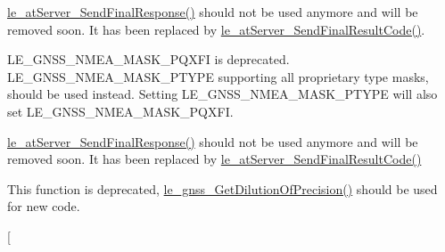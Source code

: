 
\begin{DoxyRefList}
\item[\label{deprecated__deprecated000008}%
\hypertarget{deprecated__deprecated000008}{}%
Page \hyperlink{c_atServer}{AT Commands Server} ]\hyperlink{le__at_server__interface_8h_a14c57753f986e5eb4928ea2eb350d9d9}{le\+\_\+at\+Server\+\_\+\+Send\+Final\+Response()} should not be used anymore and will be removed soon. It has been replaced by \hyperlink{le__at_server__interface_8h_ad3f175c366a50d92f8011d7062bdd147}{le\+\_\+at\+Server\+\_\+\+Send\+Final\+Result\+Code()}. 
\item[\label{deprecated__deprecated000003}%
\hypertarget{deprecated__deprecated000003}{}%
Page \hyperlink{platformConstraintsGnss}{G\+N\+SS platform constraints} ]L\+E\+\_\+\+G\+N\+S\+S\+\_\+\+N\+M\+E\+A\+\_\+\+M\+A\+S\+K\+\_\+\+P\+Q\+X\+FI is deprecated. L\+E\+\_\+\+G\+N\+S\+S\+\_\+\+N\+M\+E\+A\+\_\+\+M\+A\+S\+K\+\_\+\+P\+T\+Y\+PE supporting all proprietary type masks, should be used instead. Setting L\+E\+\_\+\+G\+N\+S\+S\+\_\+\+N\+M\+E\+A\+\_\+\+M\+A\+S\+K\+\_\+\+P\+T\+Y\+PE will also set L\+E\+\_\+\+G\+N\+S\+S\+\_\+\+N\+M\+E\+A\+\_\+\+M\+A\+S\+K\+\_\+\+P\+Q\+X\+FI. 
\item[\label{deprecated__deprecated000009}%
\hypertarget{deprecated__deprecated000009}{}%
Global \hyperlink{le__at_server__interface_8h_a14c57753f986e5eb4928ea2eb350d9d9}{le\+\_\+at\+Server\+\_\+\+Send\+Final\+Response} (le\+\_\+at\+Server\+\_\+\+Cmd\+Ref\+\_\+t command\+Ref, le\+\_\+at\+Server\+\_\+\+Final\+Rsp\+\_\+t final\+Response, bool custom\+String\+Available, const char $\ast$\+L\+E\+\_\+\+N\+O\+N\+N\+U\+LL final\+Rsp)]\hyperlink{le__at_server__interface_8h_a14c57753f986e5eb4928ea2eb350d9d9}{le\+\_\+at\+Server\+\_\+\+Send\+Final\+Response()} should not be used anymore and will be removed soon. It has been replaced by \hyperlink{le__at_server__interface_8h_ad3f175c366a50d92f8011d7062bdd147}{le\+\_\+at\+Server\+\_\+\+Send\+Final\+Result\+Code()} 
\item[\label{deprecated__deprecated000011}%
\hypertarget{deprecated__deprecated000011}{}%
Global \hyperlink{le__gnss__interface_8h_a70504e7c542d626aa07948d8330020c7}{le\+\_\+gnss\+\_\+\+Get\+Dop} (le\+\_\+gnss\+\_\+\+Sample\+Ref\+\_\+t position\+Sample\+Ref, uint16\+\_\+t $\ast$hdop\+Ptr, uint16\+\_\+t $\ast$vdop\+Ptr, uint16\+\_\+t $\ast$pdop\+Ptr)]This function is deprecated, \hyperlink{le__gnss__interface_8h_a87cbadea6fe7ebd8ef74d45bdeef1416}{le\+\_\+gnss\+\_\+\+Get\+Dilution\+Of\+Precision()} should be used for new code. 
\item[\label{deprecated__deprecated000010}%

\end{DoxyRefList}
